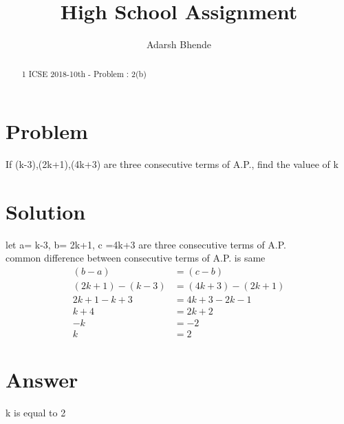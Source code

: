 \documentclass[twocolumn,3p]{elsarticle}
\begin{document}
\title{High School Assignment}
\author{Adarsh Bhende}

\maketitle

\begin{abstract}
1 ICSE 2018-10th - Problem : 2(b)
\end{abstract}

\section{Problem}
If (k-3),(2k+1),(4k+3) are three consecutive terms of A.P., find the valuee of k



\section{Solution}
let a= k-3, b= 2k+1, c =4k+3 are three consecutive terms of A.P.\\

common difference between consecutive terms of A.P. is same\\
\begin{align}
(b-a) & = (c-b)\\
(2k+1)-(k-3)& =(4k+3)-(2k+1)\\
2k+1 -k+3 & = 4k+3 -2k-1\\
k + 4 & = 2k + 2\\
-k  & =  -2\\
k & = 2
\end{align}

\section{Answer}
k is equal to 2
\end{document}
